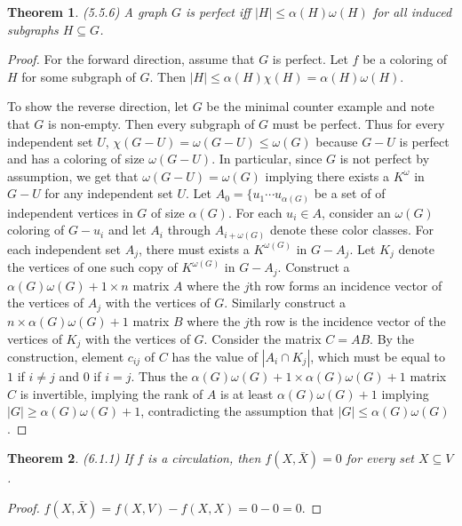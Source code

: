 \documentclass[12pt]{article}
\newtheorem{theorem}{Theorem}
\begin{document}
\begin{theorem} (5.5.6) A graph $G$ is perfect iff
  $|H| \leq \alpha(H) \omega(H)$ for all induced subgraphs
  $H \subseteq G$.
\end{theorem}
\begin{proof} For the forward direction, assume that $G$ is
  perfect. Let $f$ be a coloring of $H$ for some subgraph of $G$. Then
  $|H| \leq \alpha(H) \chi(H) = \alpha(H) \omega(H)$.

  To show the reverse direction, let $G$ be the minimal counter
  example and note that $G$ is non-empty. Then every subgraph of $G$
  must be perfect. Thus for every independent set $U$,
  $\chi(G - U) = \omega(G - U) \leq \omega(G)$ because $G - U$ is
  perfect and has a coloring of size $\omega(G - U)$. In particular,
  since $G$ is not perfect by assumption, we get that
  $\omega(G - U) = \omega(G)$ implying there exists a $K^\omega$ in
  $G-U$ for any independent set $U$. Let
  $A_0 = \{ u_1 \cdots u_{\alpha(G)}$ be a set of of independent
  vertices in $G$ of size $\alpha(G)$. For each $u_i \in A$, consider
  an $\omega(G)$ coloring of $G - u_i$ and let $A_{i}$ through
  $A_{i + \omega(G)}$ denote these color classes. For each independent
  set $A_j$, there must exists a $K^{\omega(G)}$ in $G - A_j$. Let
  $K_j$ denote the vertices of one such copy of $K^{\omega(G)}$ in
  $G - A_j$. Construct a $\alpha(G)\omega(G) + 1 \times n$ matrix $A$
  where the $j$th row forms an incidence vector of the vertices of
  $A_j$ with the vertices of $G$. Similarly construct a
  $n \times \alpha(G)\omega(G) + 1$ matrix $B$ where the $j$th row is
  the incidence vector of the vertices of $K_j$ with the vertices of
  $G$. Consider the matrix $C = AB$. By the construction, element
  $c_{ij}$ of $C$ has the value of $|A_i \cap K_j|$, which must be
  equal to $1$ if $i \neq j$ and $0$ if $i = j$. Thus the
  $\alpha(G)\omega(G) + 1 \times \alpha(G)\omega(G) + 1$ matrix $C$ is
  invertible, implying the rank of $A$ is at least
  $\alpha(G) \omega(G) + 1$ implying
  $|G| \geq \alpha(G) \omega(G) + 1$, contradicting the assumption
  that $|G| \leq \alpha(G) \omega(G)$.
\end{proof}

\begin{theorem} (6.1.1) If $f$ is a circulation, then
  $f(X, \bar{X}) = 0$ for every set $X \subseteq V$.
\end{theorem}
\begin{proof} $f(X, \bar{X}) = f(X, V) - f(X,X) = 0 - 0 = 0$.
\end{proof}
\end{document}
